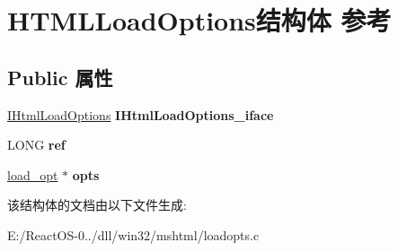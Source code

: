 \hypertarget{struct_h_t_m_l_load_options}{}\section{H\+T\+M\+L\+Load\+Options结构体 参考}
\label{struct_h_t_m_l_load_options}
\subsection*{Public 属性}
\begin{DoxyCompactItemize}
\item 
\mbox{\label{struct_h_t_m_l_load_options_af5435b92a905073c7ee4d7a5b17d1070}} 
\hyperlink{interface_i_html_load_options}{I\+Html\+Load\+Options} {\bfseries I\+Html\+Load\+Options\+\_\+iface}
\item 
\mbox{\label{struct_h_t_m_l_load_options_af72b886647d51780ae951cc6f4340546}} 
L\+O\+NG {\bfseries ref}
\item 
\mbox{\label{struct_h_t_m_l_load_options_a14c1c266aab2f106405c00d76995d883}} 
\hyperlink{structload__opt}{load\+\_\+opt} $\ast$ {\bfseries opts}
\end{DoxyCompactItemize}


该结构体的文档由以下文件生成\+:\begin{DoxyCompactItemize}
\item 
E\+:/\+React\+O\+S-\/0../dll/win32/mshtml/loadopts.\+c\end{DoxyCompactItemize}
